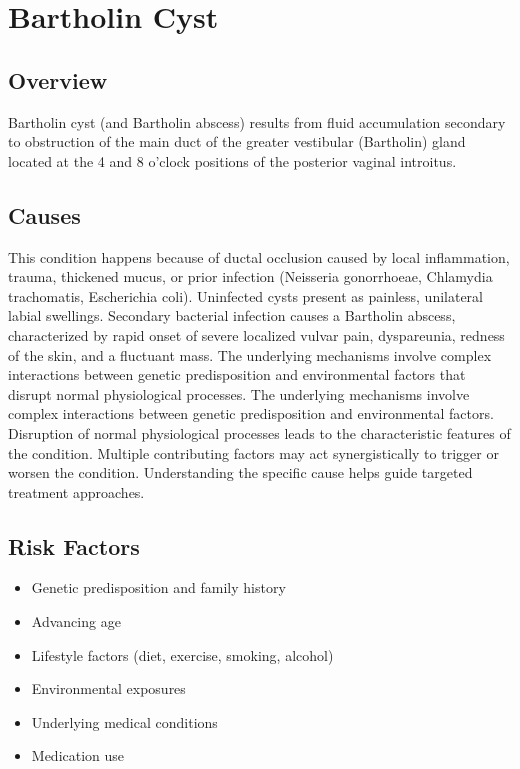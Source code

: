 \chapter{Bartholin Cyst}
\label{sec:Bartholin Cyst}

\section{Overview}
Bartholin cyst (and Bartholin abscess) results from fluid accumulation secondary to obstruction of the main duct of the greater vestibular (Bartholin) gland located at the 4 and 8 o'clock positions of the posterior vaginal introitus.
\section{Causes}
This condition happens because of ductal occlusion caused by local inflammation, trauma, thickened mucus, or prior infection (Neisseria gonorrhoeae, Chlamydia trachomatis, Escherichia coli). Uninfected cysts present as painless, unilateral labial swellings. Secondary bacterial infection causes a Bartholin abscess, characterized by rapid onset of severe localized vulvar pain, dyspareunia, redness of the skin, and a fluctuant mass. The underlying mechanisms involve complex interactions between genetic predisposition and environmental factors that disrupt normal physiological processes. The underlying mechanisms involve complex interactions between genetic predisposition and environmental factors. Disruption of normal physiological processes leads to the characteristic features of the condition. Multiple contributing factors may act synergistically to trigger or worsen the condition. Understanding the specific cause helps guide targeted treatment approaches.
\section{Risk Factors}


\begin{itemize}[noitemsep]
  \item Genetic predisposition and family history
  \item Advancing age
  \item Lifestyle factors (diet, exercise, smoking, alcohol)
  \item Environmental exposures
  \item Underlying medical conditions
  \item Medication use
\end{itemize}
